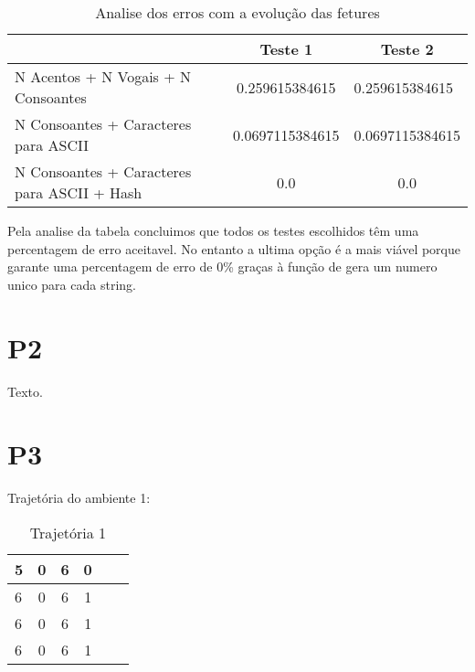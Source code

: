 \documentclass{scrartcl}
\begin{document}
\begin{table}[htbp]
    \centering
    \caption{Analise dos erros com a evolução das fetures}
    \label{my-label}
    \begin{tabular}{|l|c|c|}
    \hline
    \multicolumn{1}{|r|}{}                                      & \textbf{Teste 1} & \textbf{Teste 2}                    \\ \hline
    N Acentos + N Vogais + N Consoantes & 0.259615384615   & \multicolumn{1}{l|}{0.259615384615} \\ \hline
    N Consoantes + Caracteres para ASCII                & 0.0697115384615  & 0.0697115384615                     \\ \hline
    N Consoantes + Caracteres para ASCII + Hash                             & 0.0              & 0.0                                 \\ \hline
    \end{tabular}
    \end{table}
\par
Pela analise da tabela concluimos que todos os testes escolhidos têm uma percentagem de erro aceitavel. No entanto a ultima opção é a mais viável porque garante uma percentagem de erro de 0\% graças à função de gera um numero unico para cada string.


\section*{P2}

Texto.

\section*{P3}

Trajetória do ambiente 1:\par

	\begin{table}[h!]
	  \centering
	  \caption{Trajetória 1}
	  \label{tab:Trajetória 1}
	  \begin{tabular}{|l|c|c|c|c|r|}
	  	\hline
	    5 & 0 & 6 & 0\\
	    \hline
	    6 & 0 & 6 & 1\\
	    \hline
	    6 & 0 & 6 & 1\\
	    \hline
	    6 & 0 & 6 & 1\\
	    \hline
	  \end{tabular}
	\end{table}
	\par
\end{document}
